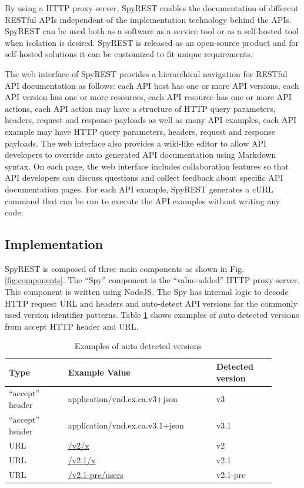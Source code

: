 \documentclass[conference]{IEEEtran}
\begin{document}
By using a HTTP proxy server, SpyREST enables the documentation of different RESTful APIs independent of the implementation technology behind the APIs. SpyREST can be used both as a software as a service tool or as a self-hosted tool when isolation is desired. SpyREST is released as an open-source product and for self-hosted solutions it can be customized to fit unique requirements.


The web interface of SpyREST provides a hierarchical navigation for RESTful API documentation as follows: each API host has one or more API versions, each API version has one or more resources, each API resource has one or more API actions, each API action may have a structure of HTTP query parameters, headers, request and response payloads as well as many API examples, each API example may have HTTP query parameters, headers, request and response payloads. The web interface also provides a wiki-like editor to allow API developers to override auto generated API documentation using Markdown syntax. On each page, the web interface includes collaboration features so that API developers can discuss questions and collect feedback about specific API documentation pages. For each API example, SpyREST generates a cURL command that can be run to execute the API examples without writing any code.


\subsection{Implementation} %
\label{sub:implementation}

SpyREST is composed of three main components as shown in Fig. \ref{fig:components}. The ``Spy'' component is the ``value-added'' HTTP proxy server. This component is written using NodeJS. The Spy has internal logic to decode HTTP request URL and headers and auto-detect API versions for the commonly used version identifier patterns. Table \ref{table:versions} shows examples of auto detected versions from accept HTTP header and URL.

\begin{table}[!tbh]
  \caption{Examples of auto detected versions}
  \begin{tabular}{|p{0.2\linewidth}|p{0.5\linewidth}|p{0.2\linewidth}|}
    \hline
    \textbf{Type} & \textbf{Example Value} & \textbf{Detected version}\\
    \hline
    ``accept'' header & application/vnd.ex.ca.v3+json & v3\\
    \hline
    ``accept'' header & application/vnd.ex.ca.v3.1+json & v3.1\\
    \hline
    URL & \url{/v2/x} & v2\\
    \hline
    URL & \url{/v2.1/x} & v2.1\\
    \hline
    URL & \url{/v2.1-pre/users} & v2.1-pre\\
    \hline
  \end{tabular}
  \label{table:versions}
\end{table}
\end{document}
